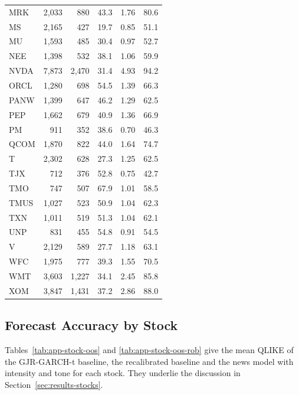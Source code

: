 \documentclass[12pt,a4paper]{article}
\begin{document}
\begin{longtable}{lrrrrr}
MRK & 2{,}033 & 880 & 43.3 & 1.76 & 80.6 \\
MS & 2{,}165 & 427 & 19.7 & 0.85 & 51.1 \\
MU & 1{,}593 & 485 & 30.4 & 0.97 & 52.7 \\
NEE & 1{,}398 & 532 & 38.1 & 1.06 & 59.9 \\
NVDA & 7{,}873 & 2{,}470 & 31.4 & 4.93 & 94.2 \\
ORCL & 1{,}280 & 698 & 54.5 & 1.39 & 66.3 \\
PANW & 1{,}399 & 647 & 46.2 & 1.29 & 62.5 \\
PEP & 1{,}662 & 679 & 40.9 & 1.36 & 66.9 \\
PM & 911 & 352 & 38.6 & 0.70 & 46.3 \\
QCOM & 1{,}870 & 822 & 44.0 & 1.64 & 74.7 \\
T & 2{,}302 & 628 & 27.3 & 1.25 & 62.5 \\
TJX & 712 & 376 & 52.8 & 0.75 & 42.7 \\
TMO & 747 & 507 & 67.9 & 1.01 & 58.5 \\
TMUS & 1{,}027 & 523 & 50.9 & 1.04 & 62.3 \\
TXN & 1{,}011 & 519 & 51.3 & 1.04 & 62.1 \\
UNP & 831 & 455 & 54.8 & 0.91 & 54.5 \\
V & 2{,}129 & 589 & 27.7 & 1.18 & 63.1 \\
WFC & 1{,}975 & 777 & 39.3 & 1.55 & 70.5 \\
WMT & 3{,}603 & 1{,}227 & 34.1 & 2.45 & 85.8 \\
XOM & 3{,}847 & 1{,}431 & 37.2 & 2.86 & 88.0 \\
\end{longtable}

\subsection{Forecast Accuracy by Stock}\label{sec:appendix-oos-stock}
Tables~\ref{tab:app-stock-oos} and \ref{tab:app-stock-oos-rob} give the mean QLIKE of the GJR-GARCH-t baseline, the recalibrated baseline and the news model with intensity and tone for each stock. They underlie the discussion in Section~\ref{sec:results-stocks}.
\end{document}
